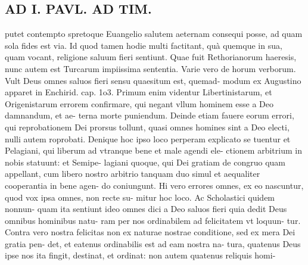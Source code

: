 \documentclass{article}
\begin{document}
\begin{pages}
\section*{AD I. PAVL. AD TIM. }
\marginpar{[ p.54 ]}\pstart putet contempto spretoque Euangelio salutem aeternam consequi posse, ad quam sola fides est via. Id quod tamen hodie multi factitant, quà quemque in sua, quam vocant, religione saluum fieri sentiunt. Quae fuit Rethorianorum haeresis, nunc autem est Turcarum impiissima sententia. Varie vero de horum verborum. Vult Deus omnes saluos fieri sensu quaesitum est, quemad- modum ex Augustino apparet in Enchirid. cap. 1o3. Primum enim videntur Libertinistarum, et Origenistarum errorem confirmare, qui negant vllum hominem esse a Deo damnandum, et ae- terna morte puniendum. Deinde etiam fauere eorum errori, qui reprobationem Dei prorsus tollunt, quasi omnes homines sint a Deo electi, nulli autem roprobati. Denique hoc ipso loco perperam explicato se tuentur et Pelagiani, qui liberum ad vtranque bene et male agendi ele- ctionem arbitrium in nobis statuunt: et Semipe- lagiani quoque, qui Dei gratiam de congruo quam appellant, cum libero nostro arbitrio tanquam duo simul et aequaliter cooperantia in bene agen- do coniungunt. Hi vero errores omnes, ex eo nascuntur, quod vox ipsa omnes, non recte su- mitur hoc loco. Ac Scholastici quidem nonnun- quam ita sentiunt ideo omnes dici a Deo saluos fieri quia dedit Deus omnibus hominibus natu- ram per nos ordinabilem ad felicitatem vt loquun- tur. Contra vero nostra felicitas non ex naturae nostrae conditione, sed ex mera Dei gratia pen- det, et eatenus ordinabilis est ad eam nostra na- tura, quatenus Deus ipse nos ita fingit, destinat, et ordinat: non autem quatenus reliquis homi-  \pend

\end{pages}
\end{document}
